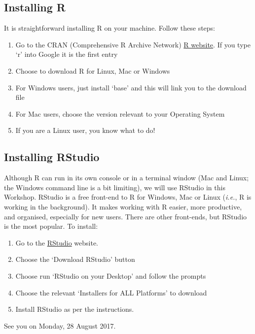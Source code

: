 \documentclass[]{book}
\theoremstyle{definition}
\theoremstyle{definition}
\theoremstyle{definition}
\theoremstyle{remark}
\begin{document}
\subsection{Installing R}\label{installing-r}

It is straightforward installing R on your machine. Follow these steps:

\begin{enumerate}
\def\labelenumi{\arabic{enumi}.}
\item
  Go to the CRAN (Comprehensive R Archive Network)
  \href{http://cran.r-project.org}{R website}. If you type `r' into
  Google it is the first entry
\item
  Choose to download R for Linux, Mac or Windows
\item
  For Windows users, just install `base' and this will link you to the
  download file
\item
  For Mac users, choose the version relevant to your Operating System
\item
  If you are a Linux user, you know what to do!
\end{enumerate}

\subsection{Installing RStudio}\label{installing-rstudio}

Although R can run in its own console or in a terminal window (Mac and
Linux; the Windows command line is a bit limiting), we will use RStudio
in this Workshop. RStudio is a free front-end to R for Windows, Mac or
Linux (\emph{i.e.}, R is working in the background). It makes working
with R easier, more productive, and organised, especially for new users.
There are other front-ends, but RStudio is the most popular. To install:

\begin{enumerate}
\def\labelenumi{\arabic{enumi}.}
\item
  Go to the \href{http://www.rstudio.com}{RStudio} website.
\item
  Choose the `Download RStudio' button
\item
  Choose run `RStudio on your Desktop' and follow the prompts
\item
  Choose the relevant `Installers for ALL Platforms' to download
\item
  Install RStudio as per the instructions.
\end{enumerate}

See you on Monday, 28 August 2017.
\end{document}

